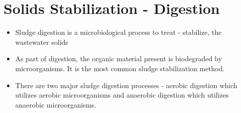 
\chapter{Solids Stabilization - Digestion}


\begin{itemize}
                \item Sludge digestion is a microbiological process to treat - stabilize, the wastewater solids
                \item As part of digestion, the organic material present is biodegraded by microorganisms.  It is the most common sludge stabilization method.  
                \item There are two major sludge digestion processes - aerobic digestion which utilizes aerobic microorganisms and anaerobic digestion which utilizes anaerobic microorganisms.\\
            \end{itemize}
